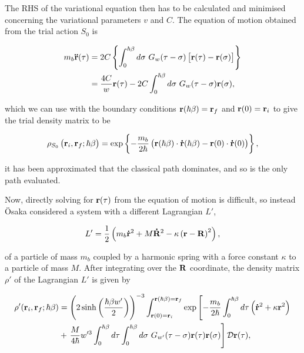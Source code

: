 The RHS of the variational equation then has to be calculated and minimised concerning the variational parameters $v$ and $C$. The equation of motion obtained from the trial action $S_0$ is

\begin{equation}
    \begin{aligned}
        m_b \vb{\ddot{r}}(\tau) &= 2C \left\{ \int^{\hbar\beta}_0 d\sigma\ G_w(\tau - \sigma) \left[ \vb{r}(\tau) - \vb{r}(\sigma) \right] \right\} \\
        &= \frac{4C}{w} \vb{r}(\tau) - 2C \int^{\hbar\beta}_0 d\sigma\ G_w(\tau - \sigma) \vb{r}(\sigma),
    \end{aligned}
\end{equation}

which we can use with the boundary conditions $\vb{r}(\hbar\beta) = \vb{r}_f$ and $\vb{r}(0) = \vb{r}_i$ to give the trial density matrix to be

\begin{equation}
    \rho_{S_0}\left(\vb{r}_i, \vb{r}_f; \hbar\beta\right) = \exp \left\{-\frac{m_b}{2\hbar}\left( \vb{r}(\hbar\beta) \cdot \vb{\dot{r}}(\hbar\beta) - \vb{r}(0) \cdot \vb{\dot{r}}(0) \right)\right\},
\end{equation}

it has been approximated that the classical path dominates, and so is the only path evaluated. 

Now, directly solving for $\vb{r}(\tau)$ from the equation of motion is difficult, so instead \"Osaka considered a system with a different Lagrangian $L'$,

\begin{equation}
    L' = \frac{1}{2} \left( m_b\vb{\dot{r}}^2 + M\vb{\dot{R}}^2 - \kappa \left( \vb{r} - \vb{R} \right)^2 \right),
\end{equation}

of a particle of mass $m_b$ coupled by a harmonic spring with a force constant $\kappa$ to a particle of mass $M$. After integrating over the $\vb{R}$ coordinate, the density matrix $\rho'$ of the Lagrangian $L'$ is given by

\begin{equation}
    \begin{aligned}
        \rho'(\vb{r}_i, \vb{r}_f; \hbar\beta) &= \left(2 \sinh\left(\frac{\hbar\beta w'}{2}\right)\right)^{-3} \int_{\vb{r}(0) = \vb{r}_i}^{\vb{r}(\hbar\beta) = \vb{r}_f} \exp \left[-\frac{m_b}{2\hbar} \int_0^{\hbar\beta} d\tau \left(\vb{\dot{r}}^2 + \kappa \vb{r}^2\right)\right. \\
        &+ \left.\frac{M}{4\hbar} w'^3 \int^{\hbar\beta}_0 d\tau \int^{\hbar\beta}_0 d\sigma\ G_{w'}(\tau - \sigma) \vb{r}(\tau) \vb{r}(\sigma) \right] \mathcal{D}\vb{r}(\tau),
    \end{aligned}
\end{equation}

